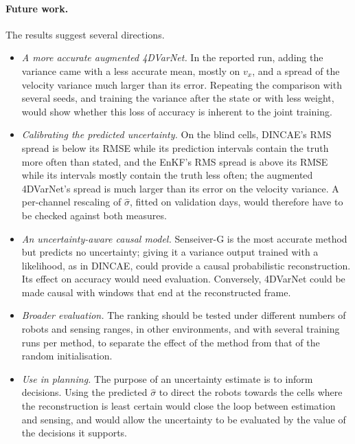 \documentclass[english, 12pt, a4paper, elec, utf8, a-2b, online]{aaltothesis}
\begin{document}
\paragraph{Future work.}
The results suggest several directions.
\begin{itemize}
	\item \emph{A more accurate augmented 4DVarNet.} In the reported run, adding
	the variance came with a less accurate mean, mostly on $v_x$, and a spread
	of the velocity variance much larger than its error. Repeating the
	comparison with several seeds, and training the variance after the state
	or with less weight, would show whether this loss of accuracy is inherent
	to the joint training.
	\item \emph{Calibrating the predicted uncertainty.} On the blind cells,
	DINCAE's RMS spread is below its RMSE while its prediction intervals contain
	the truth more often than stated, and the EnKF's RMS spread is above its RMSE
	while its intervals mostly contain the truth less often; the augmented
	4DVarNet's spread is much larger than its error on the velocity variance. A
	per-channel rescaling of $\hat{\sigma}$, fitted on validation days, would
	therefore have to be checked against both measures.
	\item \emph{An uncertainty-aware causal model.} Senseiver\nobreakdash-G is the most
	accurate method but predicts no uncertainty; giving it a variance output
	trained with a likelihood, as in DINCAE, could provide a causal probabilistic
	reconstruction. Its effect on accuracy would need evaluation. Conversely, 4DVarNet could be made causal with
	windows that end at the reconstructed frame.
	\item \emph{Broader evaluation.} The ranking should be tested under different
	numbers of robots and sensing ranges, in other environments, and with
	several training runs per method, to separate the effect of the method from
	that of the random initialisation.
	\item \emph{Use in planning.} The purpose of an uncertainty estimate is to
	inform decisions. Using the predicted $\hat{\sigma}$ to direct the robots
	towards the cells where the reconstruction is least certain would close the
	loop between estimation and sensing, and would allow the uncertainty to be
	evaluated by the value of the decisions it supports.
\end{itemize}

\clearpage


\printbibliography[heading=bibintoc]
\end{document}
